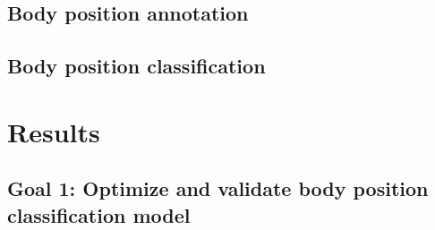 \documentclass[
  man]{apa6}
\begin{document}
\hypertarget{body-position-annotation}{%
\subsection{Body position annotation}\label{body-position-annotation}}

\hypertarget{body-position-classification}{%
\subsection{Body position classification}\label{body-position-classification}}

\hypertarget{results}{%
\section{Results}\label{results}}

\hypertarget{goal-1-optimize-and-validate-body-position-classification-model}{%
\subsection{Goal 1: Optimize and validate body position classification model}\label{goal-1-optimize-and-validate-body-position-classification-model}}
\end{document}
